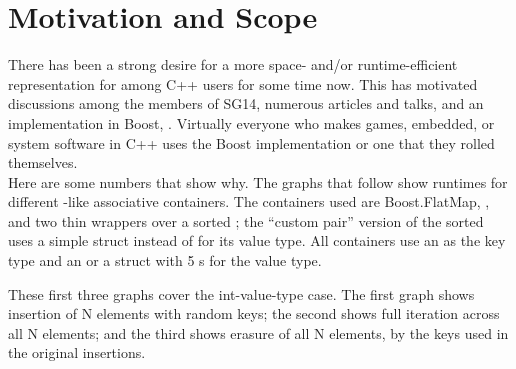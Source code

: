 \section{Motivation and Scope}

There has been a strong desire for a more space- and/or runtime-efficient
representation for  among C++ users for some time now.  This has
motivated discussions among the members of SG14, numerous articles and talks,
and an implementation in Boost, .  Virtually
everyone who makes games, embedded, or system software in C++ uses the Boost
implementation or one that they rolled themselves.\\

Here are some numbers that show why.  The graphs that follow show runtimes for
different -like associative containers.  The containers used are
Boost.FlatMap, , and two thin wrappers over a sorted
; the ``custom pair'' version of the sorted
 uses a simple struct instead of  for its
value type.  All containers use an  as the key type and an
 or a struct with 5 s for the value type.

These first three graphs cover the int-value-type case.  The first
graph shows insertion of N elements with random keys; the second shows full
iteration across all N elements; and the third shows erasure of all N
elements, by the keys used in the original insertions.


